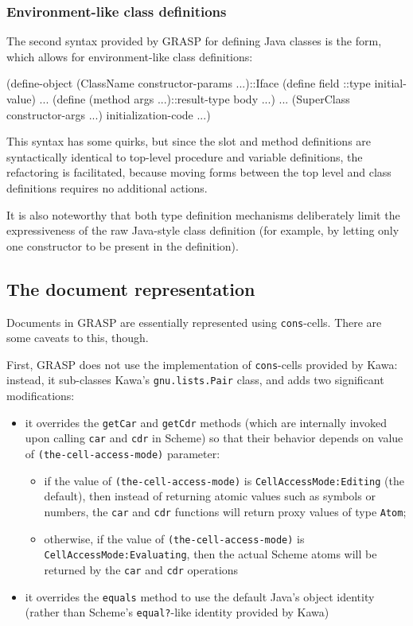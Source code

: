 \documentclass[sigconf]{acmart}
\newenvironment{Snippet}{\Verbatim[samepage=true]}{\endVerbatim}
\begin{document}
\subsubsection{Environment-like class definitions}

The second syntax provided by GRASP for defining
Java classes is the form, which allows
for environment-like class definitions:

\begin{Snippet}
(define-object (ClassName constructor-params ...)::Iface
  (define field ::type initial-value)
  ...
  (define (method args ...)::result-type body ...)
  ...
  (SuperClass constructor-args ...)
  initialization-code ...)
\end{Snippet}

This syntax has some quirks, but since the slot and method
definitions are syntactically identical to top-level procedure
and variable definitions, the refactoring is facilitated,
because moving forms between the top level and class definitions
requires no additional actions.

It is also noteworthy that both type definition mechanisms
deliberately limit the expressiveness of the raw Java-style
class definition (for example, by letting only one constructor
to be present in the definition).

\subsection{The document representation}

Documents in GRASP are essentially represented
using \texttt{cons}-cells. There are some caveats to this, though.

First, GRASP does not use the implementation of \texttt{cons}-cells
provided by Kawa: instead, it sub-classes Kawa's \texttt{gnu\-.lists\-.Pair}
class, and adds two significant modifications:
\begin{itemize}
\item it overrides the \texttt{getCar} and \texttt{getCdr} methods (which are
internally invoked upon calling \texttt{car} and \texttt{cdr} in Scheme)
so that their behavior depends on value of \texttt{(the-cell-access-mode)}
parameter:
\begin{itemize}
\item if the value of \texttt{(the-cell-access-mode)} is
\texttt{Cell\-Access\-Mode\-:Editing} (the default), then
instead of returning atomic values such as symbols or numbers, 
the \texttt{car} and \texttt{cdr} functions will return proxy 
values of type \texttt{Atom};
\item otherwise, if the value of \texttt{(the-cell-access-mode)}
is \texttt{Cell\-Access\-Mode\-:Evaluating}, then the actual
Scheme atoms will be returned by the \texttt{car} and \texttt{cdr}
operations
\end{itemize}
\item it overrides the \texttt{equals} method to use the default Java's
object identity (rather than Scheme's \texttt{equal?}-like
identity provided by Kawa)
\end{itemize}
\end{document}
